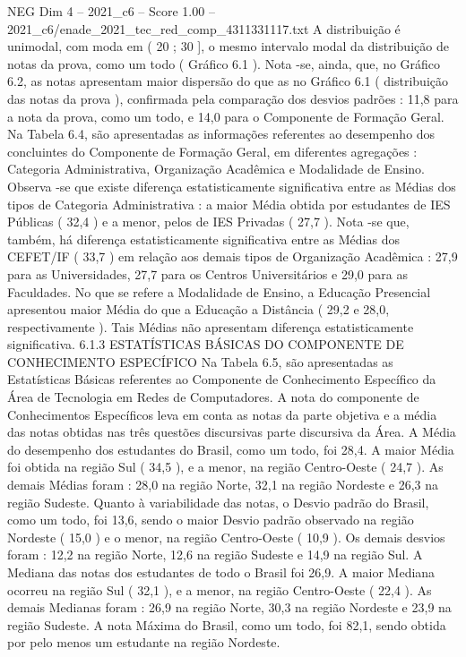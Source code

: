 \begin{textsample}{NEG Dim 4 – 2021\_c6 – Score 1.00 – 2021\_c6/enade\_2021\_tec\_red\_comp\_4311331117.txt}
A distribuição é unimodal, com moda em ( 20 ; 30 ], o mesmo intervalo modal da distribuição de notas da prova, como um todo ( Gráfico 6.1 ).
Nota -se, ainda, que, no Gráfico 6.2, as notas apresentam maior dispersão do que as no Gráfico 6.1 ( distribuição das notas da prova ), confirmada pela comparação dos desvios padrões : 11,8 para a nota da prova, como um todo, e 14,0 para o Componente de Formação Geral.
Na Tabela 6.4, são apresentadas as informações referentes ao desempenho dos concluintes do Componente de Formação Geral, em diferentes agregações : Categoria Administrativa, Organização Acadêmica e Modalidade de Ensino.
Observa -se que existe diferença estatisticamente significativa entre as Médias dos tipos de Categoria Administrativa : a maior Média obtida por estudantes de IES Públicas ( 32,4 ) e a menor, pelos de IES Privadas ( 27,7 ).
Nota -se que, também, há diferença estatisticamente significativa entre as Médias dos CEFET/IF ( 33,7 ) em relação aos demais tipos de Organização Acadêmica : 27,9 para as Universidades, 27,7 para os Centros Universitários e 29,0 para as Faculdades.
No que se refere a Modalidade de Ensino, a Educação Presencial apresentou maior Média do que a Educação a Distância ( 29,2 e 28,0, respectivamente ).
Tais Médias não apresentam diferença estatisticamente significativa. 6.1.3 ESTATÍSTICAS BÁSICAS DO COMPONENTE DE CONHECIMENTO ESPECÍFICO Na Tabela 6.5, são apresentadas as Estatísticas Básicas referentes ao Componente de Conhecimento Específico da Área de Tecnologia em Redes de Computadores.
A nota do componente de Conhecimentos Específicos leva em conta as notas da parte objetiva e a média das notas obtidas nas três questões discursivas parte discursiva da Área.
A Média do desempenho dos estudantes do Brasil, como um todo, foi 28,4.
A maior Média foi obtida na região Sul ( 34,5 ), e a menor, na região Centro-Oeste ( 24,7 ).
As demais Médias foram : 28,0 na região Norte, 32,1 na região Nordeste e 26,3 na região Sudeste.
Quanto à variabilidade das notas, o Desvio padrão do Brasil, como um todo, foi 13,6, sendo o maior Desvio padrão observado na região Nordeste ( 15,0 ) e o menor, na região Centro-Oeste ( 10,9 ).
Os demais desvios foram : 12,2 na região Norte, 12,6 na região Sudeste e 14,9 na região Sul.
A Mediana das notas dos estudantes de todo o Brasil foi 26,9.
A maior Mediana ocorreu na região Sul ( 32,1 ), e a menor, na região Centro-Oeste ( 22,4 ).
As demais Medianas foram : 26,9 na região Norte, 30,3 na região Nordeste e 23,9 na região Sudeste.
A nota Máxima do Brasil, como um todo, foi 82,1, sendo obtida por pelo menos um estudante na região Nordeste.

\end{textsample}
